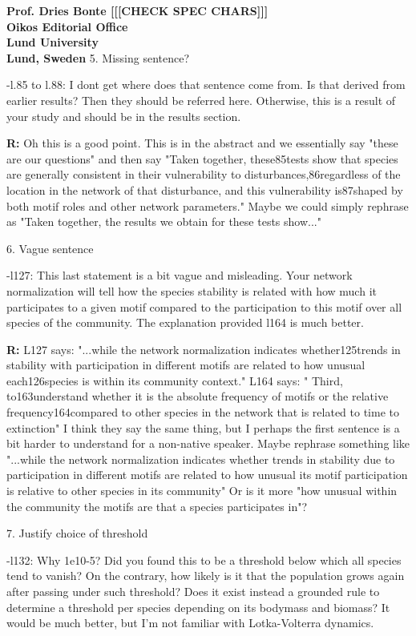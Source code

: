 \documentclass[12pt]{letter}
\begin{document}
\begin{letter}{\bf Prof. Dries Bonte [[[CHECK SPEC CHARS]]]\\
Oikos Editorial Office \\
Lund University \\
Lund, Sweden}
    5. Missing sentence?

      -l.85 to l.88: I dont get where does that sentence come from. Is that derived from earlier results? Then they should be referred here. Otherwise, this is a result of your study and should be in the results section.

      \textbf{R:}
      Oh this is a good point. This is in the abstract and we essentially say "these are our questions" and then say "Taken together, these85tests show that species are generally consistent in their vulnerability to disturbances,86regardless of the location in the network of that disturbance, and this vulnerability is87shaped by both motif roles and other network parameters." Maybe we could simply rephrase as "Taken together, the results we obtain for these tests show..."


    6. Vague sentence

      -l127: This last statement is a bit vague and misleading. Your network normalization will tell how the species stability is related with how much it participates to a given motif compared to the participation to this motif over all species of the community. The explanation provided l164 is much better.

      \textbf{R:}
      L127 says: "...while the network normalization indicates whether125trends in stability with participation in different motifs are related to how unusual each126species is within its community context." L164 says: " Third, to163understand whether it is the absolute frequency of motifs or the relative frequency164compared to other species in the network that is related to time to extinction" I think they say the same thing, but I perhaps the first sentence is a bit harder to understand for a non-native speaker. Maybe rephrase something like "...while the network normalization indicates whether trends in stability due to participation in different motifs are related to how unusual its motif participation is relative to other species in its community" Or is it more "how unusual within the community the motifs are that a species participates in"?


    7. Justify choice of threshold

      -l132: Why 1e10-5? Did you found this to be a threshold below which all species tend to vanish? On the contrary, how likely is it that the population grows again after passing under such threshold? Does it exist instead a grounded rule to determine a threshold per species depending on its bodymass and biomass? It would be much better, but I’m not familiar with Lotka-Volterra dynamics.


\end{letter}
\end{document}
